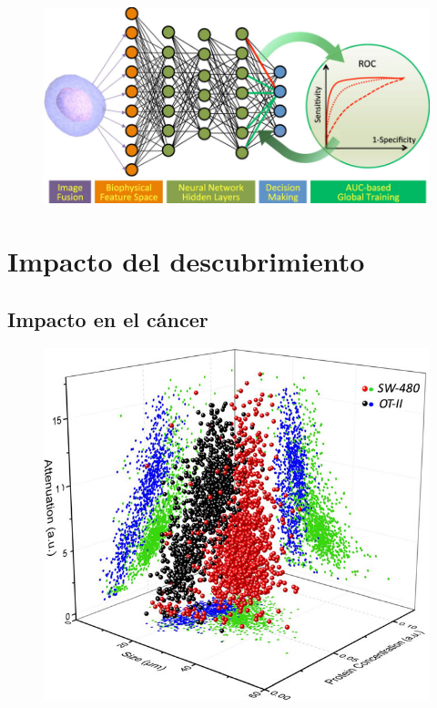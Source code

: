 \documentclass{beamer}
\begin{document}
\begin{frame}
	\begin{figure}
		\centering
		\includegraphics[width=\linewidth]{neural}
	\end{figure}
\end{frame}

\section{Impacto del descubrimiento}

\subsection{Impacto en el cáncer}

\begin{frame}
	\begin{figure}
		\centering
		\includegraphics[height=.9\textheight]{impacto_1}
	\end{figure}
\end{frame}
\end{document}

